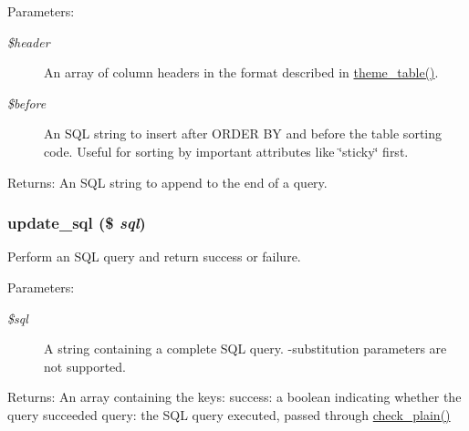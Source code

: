 \begin{Desc}
\item[Parameters:]
\begin{description}
\item[{\em \$header}]An array of column headers in the format described in \hyperlink{group__themeable_g77f053aaa73bbeaa3943bf8f06ce625d}{theme\_\-table()}. \item[{\em \$before}]An SQL string to insert after ORDER BY and before the table sorting code. Useful for sorting by important attributes like \char`\"{}sticky\char`\"{} first. \end{description}
\end{Desc}
\begin{Desc}
\item[Returns:]An SQL string to append to the end of a query. \end{Desc}
\hypertarget{group__database_g67680310ffaf72da52a9c2453325c0fb}{
\subsubsection[{update\_\-sql}]{\setlength{\rightskip}{0pt plus 5cm}update\_\-sql (\$ {\em sql})}}
\label{group__database_g67680310ffaf72da52a9c2453325c0fb}


Perform an SQL query and return success or failure.

\begin{Desc}
\item[Parameters:]
\begin{description}
\item[{\em \$sql}]A string containing a complete SQL query. -substitution parameters are not supported. \end{description}
\end{Desc}
\begin{Desc}
\item[Returns:]An array containing the keys: success: a boolean indicating whether the query succeeded query: the SQL query executed, passed through \hyperlink{bootstrap_8inc_76fc67a30fd8d75ddd80565e6e65a13d}{check\_\-plain()} \end{Desc}
